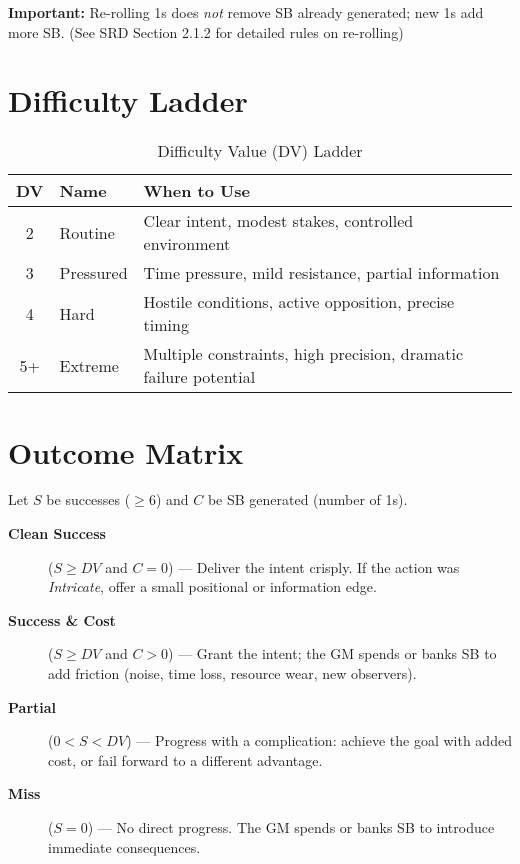 \noindent\textbf{Important:} Re-rolling 1s does \emph{not} remove SB already generated; new 1s add more SB. (See SRD Section 2.1.2 for detailed rules on re-rolling) 

\section{Difficulty Ladder}
\label{sec:difficulty-ladder}

\begin{table}[htbp]
\centering
\begin{tabular}{clp{8cm}}
\toprule
\textbf{DV} & \textbf{Name} & \textbf{When to Use} \\
\midrule
2 & Routine & Clear intent, modest stakes, controlled environment \\
3 & Pressured & Time pressure, mild resistance, partial information \\
4 & Hard & Hostile conditions, active opposition, precise timing \\
5+ & Extreme & Multiple constraints, high precision, dramatic failure potential \\
\bottomrule
\end{tabular}
\caption{Difficulty Value (DV) Ladder}
\label{tab:difficulty-ladder}
\end{table}

\section{Outcome Matrix}
\label{sec:outcome-matrix}

Let $S$ be successes ($\geq 6$) and $C$ be SB generated (number of 1s).

\begin{description}
\item[\textbf{Clean Success}] ($S \geq DV$ and $C = 0$) — Deliver the intent crisply. If the action was \emph{Intricate}, offer a small positional or information edge. 
\item[\textbf{Success \& Cost}] ($S \geq DV$ and $C > 0$) — Grant the intent; the GM spends or banks SB to add friction (noise, time loss, resource wear, new observers). 
\item[\textbf{Partial}] ($0 < S < DV$) — Progress with a complication: achieve the goal with added cost, or fail forward to a different advantage. 
\item[\textbf{Miss}] ($S = 0$) — No direct progress. The GM spends or banks SB to introduce immediate consequences. 
\end{description}

